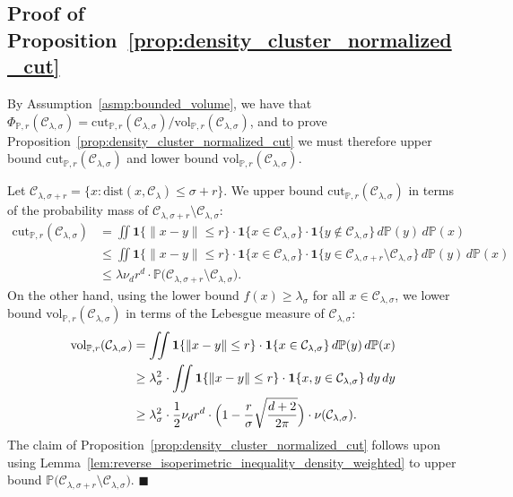 \documentclass[twoside,11pt]{article}
\newcommand{\1}{\mathbf{1}}
\newcommand{\mc}[1]{\mathcal{#1}}
\newcommand{\Pbb}{\mathbb{P}}
\newcommand{\vol}{\mathrm{vol}}
\newcommand{\cut}{\mathrm{cut}}
\newcommand{\qed}{\hfill $\blacksquare$}
\begin{document}
\subsection{Proof of Proposition~\ref{prop:density_cluster_normalized_cut}}
\label{subsec:density_cluster_ncut}
By Assumption~\ref{asmp:bounded_volume}, we have that $\Phi_{\Pbb,r}(\mc{C}_{\lambda,\sigma}) = \cut_{\Pbb,r}(\mc{C}_{\lambda,\sigma})/\vol_{\Pbb,r}(\mc{C}_{\lambda,\sigma})$, and to prove Proposition~\ref{prop:density_cluster_normalized_cut} we must therefore upper bound $\cut_{\Pbb,r}(\mc{C}_{\lambda,\sigma})$ and lower bound $\vol_{\Pbb,r}(\mc{C}_{\lambda,\sigma})$. 

Let $\mc{C}_{\lambda,\sigma + r} = \{x: \mathrm{dist}(x,\mc{C}_{\lambda}) \leq \sigma + r\}$. We upper bound $\cut_{\Pbb,r}(\mc{C}_{\lambda,\sigma})$ in terms of the probability mass of $\mc{C}_{\lambda,\sigma + r} \setminus \mc{C}_{\lambda,\sigma}$:
\begin{align*}
\cut_{\Pbb,r}(\mc{C}_{\lambda,\sigma}) & = \iint \1\{\|x - y\| \leq r \} \cdot \1\{x \in \mc{C}_{\lambda,\sigma}\} \cdot \1\{y \not\in \mc{C}_{\lambda,\sigma} \} \,d\Pbb(y) \,d\Pbb(x) \\
& \leq  \iint \1\{\|x - y\| \leq r \} \cdot \1\{x \in \mc{C}_{\lambda,\sigma}\} \cdot \1\{y \in \mc{C}_{\lambda,\sigma + r} \setminus \mc{C}_{\lambda,\sigma}  \} \,d\Pbb(y) \,d\Pbb(x) \\
& \leq \lambda \nu_d r^d \cdot \Pbb\bigl(\mc{C}_{\lambda,\sigma + r} \setminus \mc{C}_{\lambda,\sigma}\bigr).
\end{align*}
On the other hand, using the lower bound $f(x) \geq \lambda_{\sigma} $ for all $x \in \mc{C}_{\lambda,\sigma}$, we lower bound $\vol_{\Pbb,r}(\mc{C}_{\lambda,\sigma})$ in terms of the Lebesgue measure of $\mc{C}_{\lambda,\sigma}$:
\begin{align*}
\vol_{\Pbb,r}(\mc{C}_{\lambda,\sigma}) & = \iint \1\{\|x - y\| \leq r \} \cdot \1\{x \in \mc{C}_{\lambda,\sigma}\} \,d\Pbb(y) \,d\Pbb(x) \\
& \geq \lambda_{\sigma}^2 \cdot \iint \1\{\|x - y\| \leq r \} \cdot \1\{x,y \in \mc{C}_{\lambda,\sigma}\} \,dy \,dy \\
& \geq \lambda_{\sigma}^2 \cdot \frac{1}{2} \nu_d r^d \cdot \Bigl(1 - \frac{r}{\sigma} \sqrt{\frac{d + 2}{2\pi}}\Bigr) \cdot \nu(\mc{C}_{\lambda,\sigma}).
\end{align*}
The claim of Proposition~\ref{prop:density_cluster_normalized_cut} follows upon using Lemma~\ref{lem:reverse_isoperimetric_inequality_density_weighted} to upper bound $\Pbb\bigl(\mc{C}_{\lambda,\sigma + r} \setminus \mc{C}_{\lambda,\sigma}\bigr)$. \qed
\end{document}
